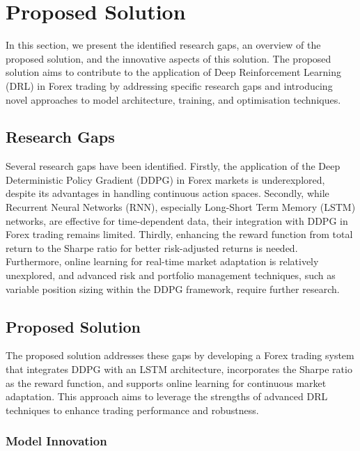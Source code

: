 \section{Proposed Solution}

In this section, we present the identified research gaps, an overview of the proposed solution, and the innovative aspects of this solution. The proposed solution aims to contribute to the application of Deep Reinforcement Learning (DRL) in Forex trading by addressing specific research gaps and introducing novel approaches to model architecture, training, and optimisation techniques.

\subsection{Research Gaps}

Several research gaps have been identified. Firstly, the application of the Deep Deterministic Policy Gradient (DDPG) in Forex markets is underexplored, despite its advantages in handling continuous action spaces. Secondly, while Recurrent Neural Networks (RNN), especially Long-Short Term Memory (LSTM) networks, are effective for time-dependent data, their integration with DDPG in Forex trading remains limited. Thirdly, enhancing the reward function from total return to the Sharpe ratio for better risk-adjusted returns is needed. Furthermore, online learning for real-time market adaptation is relatively unexplored, and advanced risk and portfolio management techniques, such as variable position sizing within the DDPG framework, require further research.

\subsection{Proposed Solution}

The proposed solution addresses these gaps by developing a Forex trading system that integrates DDPG with an LSTM architecture, incorporates the Sharpe ratio as the reward function, and supports online learning for continuous market adaptation. This approach aims to leverage the strengths of advanced DRL techniques to enhance trading performance and robustness.

\subsubsection{Model Innovation}

